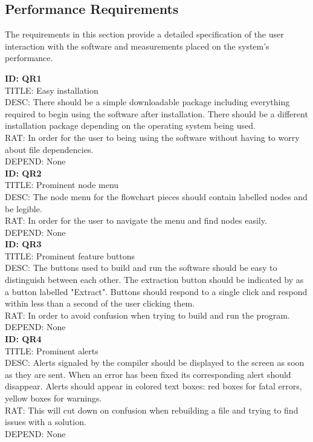\documentclass[journal,10pt,onecolumn,compsoc]{IEEEtran} \usepackage[margin=1.0in]{geometry} \usepackage{pdfpages} \usepackage{graphicx}
\begin{document}
\subsection{Performance Requirements}

The requirements in this section provide a detailed specification of the user interaction with the software and measurements placed on the system's performance.

\noindent
\textbf{ID: QR1}\\
TITLE: Easy installation\\
DESC: There should be a simple downloadable package including everything required to begin using the software after installation.
There should be a different installation package depending on the operating system being used.\\
RAT: In order for the user to being using the software without having to worry about file dependencies.\\
DEPEND: None\\

\noindent
\textbf{ID: QR2}\\
TITLE: Prominent node menu\\
DESC: The node menu for the flowchart pieces should contain labelled nodes and be legible.\\
RAT: In order for the user to navigate the menu and find nodes easily.\\
DEPEND: None\\

\noindent
\textbf{ID: QR3}\\
TITLE: Prominent feature buttons\\
DESC: The buttons used to build and run the software should be easy to distinguish between each other. 
The extraction button should be indicated by as a button labelled "Extract".
Buttons should respond to a single click and respond within less than a second of the user clicking them.\\
RAT: In order to avoid confusion when trying to build and run the program.\\
DEPEND: None\\

\noindent
\textbf{ID: QR4}\\
TITLE: Prominent alerts\\
DESC: Alerts signaled by the compiler should be displayed to the screen as soon as they are sent. 
When an error has been fixed its corresponding alert should disappear.
Alerts should appear in colored text boxes: red boxes for fatal errors, yellow boxes for warnings.\\
RAT: This will cut down on confusion when rebuilding a file and trying to find issues with a solution.\\
DEPEND: None\\
\end{document}
